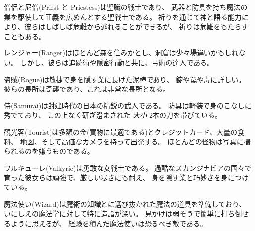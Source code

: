 \item[\bb{Priests} and {\bb Priestesses}]
僧侶と尼僧(Priest と Priestess)は聖職の戦士であり、
武器と防具を持ち魔法の業を駆使して正義を広めんとする聖戦士である。
祈りを通じて神と語る能力により、彼らはしばしば危難から逃れることができるが、
祈りは危難をもたらすこともある。
\item[\bb{Rangers}]%
レンジャー(Ranger)はほとんど森を住みかとし、洞窟は少々場違いかもしれない。
しかし、彼らは追跡術や隠密行動と共に、弓術の達人である。
\item[\bb{Rogues}]%
盗賊(Rogue)は敏捷で身を隠す業に長けた泥棒であり、
錠や罠や毒に詳しい。
彼らの長所は奇襲であり、これは非常な長所となる。
\item[\bb{Samurai}]%
侍(Samurai)は封建時代の日本の精鋭の武人である。
防具は軽装で身のこなしに秀でており、
この上なく研ぎ澄まされた {\it 大小 } 2本の刀を帯びている。
\item[\bb{Tourists}]%
観光客(Tourist)は多額の金(買物に最適である)とクレジットカード、大量の食料、
地図、そして高価なカメラを持って出発する。
ほとんどの怪物は写真に撮られるのを嫌うものである。
\item[\bb{Valkyries}]%
ワルキューレ(Valkyrie)は勇敢な女戦士である。
過酷なスカンジナビアの国々で育った彼女らは頑強で、厳しい寒さにも耐え、
身を隠す業と巧妙さを身につけている。
\item[\bb{Wizards}]%
魔法使い(Wizard)は魔術の知識とに選び抜かれた魔法の道具を準備しており、
いにしえの魔法学に対して特に造詣が深い。
見かけは弱そうで簡単に打ち倒せるように思えるが、
経験を積んだ魔法使いは恐るべき敵である。
\elist

